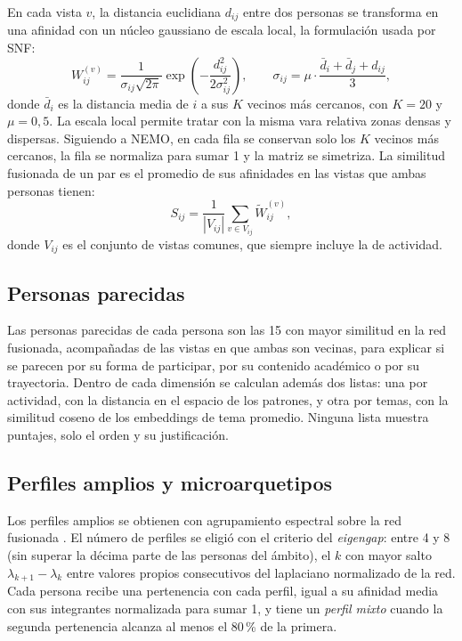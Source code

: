 En cada vista $v$, la distancia euclidiana $d_{ij}$ entre dos personas se transforma en una afinidad con un núcleo gaussiano de escala local, la formulación usada por SNF:
\begin{equation}
    W^{(v)}_{ij} = \frac{1}{\sigma_{ij}\sqrt{2\pi}} \exp\left(-\frac{d_{ij}^2}{2\sigma_{ij}^2}\right), \qquad
    \sigma_{ij} = \mu \cdot \frac{\bar{d}_i + \bar{d}_j + d_{ij}}{3},
    \label{eq:afinidad}
\end{equation}
donde $\bar{d}_i$ es la distancia media de $i$ a sus $K$ vecinos más cercanos, con $K = 20$ y $\mu = 0{,}5$. La escala local permite tratar con la misma vara relativa zonas densas y dispersas. Siguiendo a NEMO, en cada fila se conservan solo los $K$ vecinos más cercanos, la fila se normaliza para sumar 1 y la matriz se simetriza. La similitud fusionada de un par es el promedio de sus afinidades en las vistas que ambas personas tienen:
\begin{equation}
    S_{ij} = \frac{1}{|V_{ij}|} \sum_{v \in V_{ij}} \tilde{W}^{(v)}_{ij},
    \label{eq:nemo}
\end{equation}
donde $V_{ij}$ es el conjunto de vistas comunes, que siempre incluye la de actividad.

\subsection{Personas parecidas}

Las personas parecidas de cada persona son las 15 con mayor similitud en la red fusionada, acompañadas de las vistas en que ambas son vecinas, para explicar si se parecen por su forma de participar, por su contenido académico o por su trayectoria. Dentro de cada dimensión se calculan además dos listas: una por actividad, con la distancia en el espacio de los patrones, y otra por temas, con la similitud coseno de los embeddings de tema promedio. Ninguna lista muestra puntajes, solo el orden y su justificación.

\subsection{Perfiles amplios y microarquetipos}
\label{sec:met_perfiles_amplios}

Los perfiles amplios se obtienen con agrupamiento espectral sobre la red fusionada \parencite{vonLuxburg2007}. El número de perfiles se eligió con el criterio del \textit{eigengap}: entre 4 y 8 (sin superar la décima parte de las personas del ámbito), el $k$ con mayor salto $\lambda_{k+1} - \lambda_k$ entre valores propios consecutivos del laplaciano normalizado de la red. Cada persona recibe una pertenencia con cada perfil, igual a su afinidad media con sus integrantes normalizada para sumar 1, y tiene un \textit{perfil mixto} cuando la segunda pertenencia alcanza al menos el 80\,\% de la primera.

